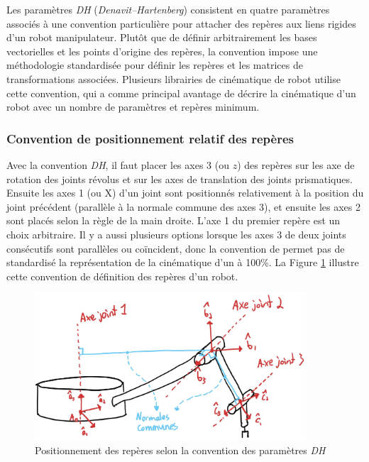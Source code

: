 Les paramètres \textit{DH} (\textit{Denavit–Hartenberg}) consistent en quatre paramètres associés à une convention particulière pour attacher des repères aux liens rigides d'un robot manipulateur. Plutôt que de définir arbitrairement les bases vectorielles et les points d'origine des repères, la convention impose une méthodologie standardisée pour définir les repères et les matrices de transformations associées. Plusieurs librairies de cinématique de robot utilise cette convention, qui a comme principal avantage de décrire la cinématique d'un robot avec un nombre de paramètres et repères minimum.


\subsubsection{Convention de positionnement relatif des repères }
Avec la convention \textit{DH}, il faut placer les axes 3 (ou $z$) des repères sur les axe de rotation des joints révolus et sur les axes de translation des joints prismatiques. Ensuite les axes 1 (ou X) d'un joint sont positionnés relativement à la position du joint précédent (parallèle à la normale commune des axes 3), et ensuite les axes 2 sont placés selon la règle de la main droite. L'axe 1 du premier repère est un choix arbitraire. Il y a aussi plusieurs options lorsque les axes 3 de deux joints consécutifs sont parallèles ou coïncident, donc la convention de permet pas de standardisé la représentation de la cinématique d'un à 100\%. La Figure \ref{fig:dh1} illustre cette convention de définition des repères d'un robot.
\begin{figure}[H]
	\centering
		\includegraphics[width=0.90\textwidth]{fig/dh1.jpg}
	\caption{Positionnement des repères selon la convention des paramètres \textit{DH}}
	\label{fig:dh1}
\end{figure}


